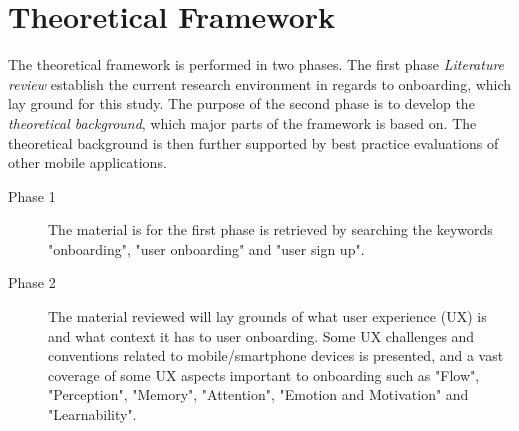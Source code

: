 

\chapter{Theoretical Framework}
\label{chap:theoretical_framework}
The theoretical framework is performed in two phases. The first phase \textit{Literature review} establish the current research environment in regards to onboarding, which lay ground for this study. The purpose of the second phase is to develop the \textit{theoretical background}, which major parts of the framework is based on. The theoretical background is then further supported by best practice evaluations of other mobile applications.

\begin{description}
  \item [Phase 1] The material is for the first phase is retrieved by searching the keywords "onboarding", "user onboarding" and "user sign up".
  \item [Phase 2] The material reviewed will lay grounds of what user experience (UX) is and what context it has to user onboarding. Some UX challenges and conventions related to mobile/smartphone devices is presented, and a vast coverage of some UX aspects important to onboarding such as "Flow", "Perception", "Memory", "Attention", "Emotion and Motivation" and "Learnability".
\end{description}

